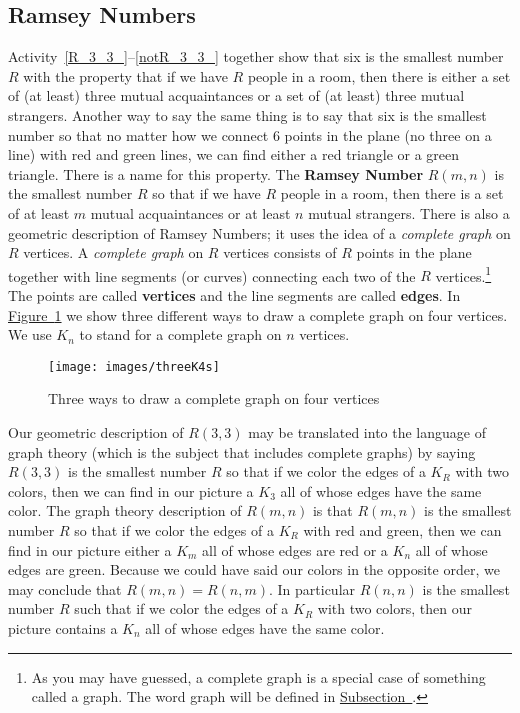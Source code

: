 \documentclass[10pt,]{book}
\newcommand{\terminology}[1]{\textbf{#1}}
\theoremstyle{plain}
\theoremstyle{definition}
\numberwithin{equation}{chapter}
\begin{document}
\subsection[{Ramsey Numbers}]{Ramsey Numbers}\label{Ramseysection}
Activity~\hyperref[R_3_3_]{\ref{R_3_3_}}--\hyperref[notR_3_3_]{\ref{notR_3_3_}} together show that six is the smallest number \(R\) with the property that if we have \(R\) people in a room, then there is either a set of (at least) three mutual acquaintances or a set of (at least) three mutual strangers. Another way to say the same thing is to say that six is the smallest number so that no matter how we connect 6 points in the plane (no three on a line) with red and green lines, we can find either a red triangle or a green triangle. There is a name for this property. The \terminology{Ramsey Number} \(R(m,n)\) is the smallest number \(R\) so that if we have \(R\) people in a room, then there is a set of at least \(m\) mutual acquaintances or at least \(n\) mutual strangers. There is also a geometric description of Ramsey Numbers; it uses the idea of a \emph{complete graph} on \(R\) vertices. A \emph{complete graph} on \(R\) vertices consists of \(R\) points in the plane together with line segments (or curves) connecting each two of the \(R\) vertices.\footnote{As you may have guessed, a complete graph is a special case of something called a graph.  The word graph will be defined in \hyperref[graphsection]{Subsection~}.\label{fn-2}} The points are called \terminology{vertices} and the line segments are called \terminology{edges}. In \hyperref[completegraph]{Figure~\ref{completegraph}} we show three different ways to draw a complete graph on four vertices. We use \(K_n\) to stand for a complete graph on \(n\) vertices.%
\begin{figure}
\centering
\texttt{[image: images/threeK4s]}
\caption{Three ways to draw a complete graph on four vertices\label{completegraph}}
\end{figure}
Our geometric description of \(R(3,3)\) may be translated into the language of graph theory (which is the subject that includes complete graphs) by saying \(R(3,3)\) is the smallest number \(R\) so that if we color the edges of a \(K_R\) with two colors, then we can find in our picture a \(K_3\) all of whose edges have the same color.  The graph theory description of \(R(m,n)\) is that \(R(m,n)\) is the smallest number \(R\) so that if we color the edges of a \(K_R\) with red and green, then we can find in our picture either a \(K_m\) all of whose edges are red or a \(K_n\) all of whose edges are green. Because we could have said our colors in the opposite order, we may conclude that \(R(m,n) = R(n,m)\). In particular \(R(n,n)\) is the smallest number \(R\) such that if we color the edges of a \(K_R\) with two colors, then our picture contains a \(K_n\) all of whose edges have the same color.%
\end{document}

